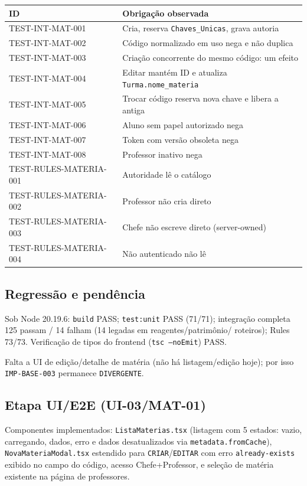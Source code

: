 \small
\begin{longtable}{@{}p{}p{}@{}}
\toprule
ID & Obrigação observada \\
\midrule
\endhead
TEST-INT-MAT-001 & Cria, reserva \texttt{Chaves\_Unicas}, grava autoria \\
TEST-INT-MAT-002 & Código normalizado em uso nega e não duplica \\
TEST-INT-MAT-003 & Criação concorrente do mesmo código: um efeito \\
TEST-INT-MAT-004 & Editar mantém ID e atualiza \texttt{Turma.nome\_materia} \\
TEST-INT-MAT-005 & Trocar código reserva nova chave e libera a antiga \\
TEST-INT-MAT-006 & Aluno sem papel autorizado nega \\
TEST-INT-MAT-007 & Token com versão obsoleta nega \\
TEST-INT-MAT-008 & Professor inativo nega \\
TEST-RULES-MATERIA-001 & Autoridade lê o catálogo \\
TEST-RULES-MATERIA-002 & Professor não cria direto \\
TEST-RULES-MATERIA-003 & Chefe não escreve direto (server-owned) \\
TEST-RULES-MATERIA-004 & Não autenticado não lê \\
\bottomrule
\end{longtable}
\normalsize

\subsection{Regressão e pendência}

Sob Node 20.19.6: \texttt{build} PASS; \texttt{test:unit} PASS (71/71);
integração completa 125 passam / 14 falham (14 legadas em reagentes/patrimônio/
roteiros); Rules 73/73. Verificação de tipos do frontend
(\texttt{tsc --noEmit}) PASS.

Falta a UI de edição/detalhe de matéria (não há listagem/edição hoje); por isso
\texttt{IMP-BASE-003} permanece \texttt{DIVERGENTE}.

\subsection{Etapa UI/E2E (UI-03/MAT-01)}

Componentes implementados: \texttt{ListaMaterias.tsx} (listagem com 5 estados:
vazio, carregando, dados, erro e dados desatualizados via
\texttt{metadata.fromCache}), \texttt{NovaMateriaModal.tsx} estendido para
\texttt{CRIAR}/\texttt{EDITAR} com erro \texttt{already-exists} exibido no
campo do código, acesso Chefe+Professor, e seleção de matéria existente na
página de professores.

